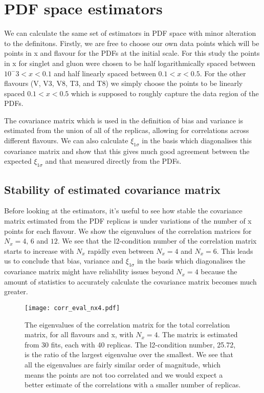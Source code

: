 \section{PDF space estimators}

We can calculate the same set of estimators in PDF space with minor alteration
to the definitons. Firstly, we are free to choose our own data points which will
be points in x and flavour for the PDFs at the initial scale. For this study the
points in x for singlet and gluon were chosen to be half logarithmically spaced
between $10^-3<x<0.1$ and half linearly spaced between $0.1<x<0.5$. For the
other flavours (V, V3, V8, T3, and T8) we simply choose the points to be
linearly spaced $0.1<x<0.5$ which is supposed to roughly capture the data region
of the PDFs.

The covariance matrix which is used in the definition of bias and variance is
estimated from the union of all of the replicas, allowing for correlations
across different flavours. We can also calculate $\xi_{1\sigma}$ in the basis
which diagonalises this covariance matrix and show that this gives much good
agreement between the expected $\xi_{1\sigma}$ and that measured directly from
the PDFs.

\subsection{Stability of estimated covariance matrix}

Before looking at the estimators, it's useful to see how stable the covariance
matrix estimated from the PDF replicas is under variations of the number of x
points for each flavour. We show the eigenvalues of the correlation matrices for
$N_x = 4,\,6$ and $12$. We see that the l2-condition number of the correlation
matrix starts to increase with $N_x$ rapidly even between $N_x=4$ and $N_x=6$.
This leads us to conclude that bias, variance and $\xi_{1\sigma}$ in the basis
which diagonalises the covariance matrix might have reliability issues beyond
$N_x = 4$ because the amount of statistics to accurately calculate the
covariance matrix becomes much greater.

\begin{figure}[]
    \centering
    \texttt{[image: corr\_eval\_nx4.pdf]}
    \caption{The eigenvalues of the correlation matrix for the total correlation
    matrix, for all flavours and x, with $N_x=4$. The matrix is estimated from
    30 fits, each with 40 replicas.
    The l2-condition number, 25.72, is the ratio of the
    largest eigenvalue over the smallest. We see that all the eigenvalues are
    fairly similar order of magnitude, which means the points are not too correlated
    and we would expect a better estimate of the correlations with a smaller
    number of replicas.}
    \label{fig:correignx4}
\end{figure}

